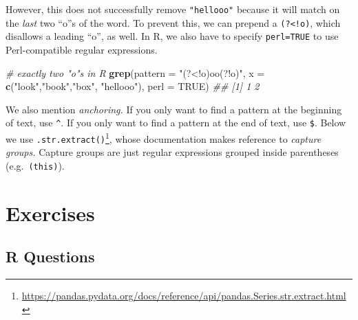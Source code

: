 \documentclass[12pt,krantz2]{krantz}
\makeatletter
\newenvironment{Shaded}{\begin{snugshade}}{\end{snugshade}}
\newcommand{\BuiltInTok}[1]{#1}
\newcommand{\CommentTok}[1]{\textcolor[rgb]{0.37,0.37,0.37}{\textit{#1}}}
\newcommand{\DataTypeTok}[1]{\textcolor[rgb]{0.27,0.27,0.27}{#1}}
\newcommand{\KeywordTok}[1]{\textcolor[rgb]{0.27,0.27,0.27}{\textbf{#1}}}
\newcommand{\NormalTok}[1]{#1}
\newcommand{\OperatorTok}[1]{\textcolor[rgb]{0.43,0.43,0.43}{\textbf{#1}}}
\newcommand{\OtherTok}[1]{\textcolor[rgb]{0.37,0.37,0.37}{#1}}
\newcommand{\StringTok}[1]{\textcolor[rgb]{0.5,0.5,0.5}{#1}}
\newcommand{\VerbatimStringTok}[1]{\textcolor[rgb]{0.5,0.5,0.5}{#1}}
\renewcommand{\href}[2]{#2\footnote{\url{#1}}}
\newenvironment{kframe}{%
\medskip{}
\setlength{\fboxsep}{.8em}
 \def\at@end@of@kframe{}%
 \ifinner\ifhmode%
  \def\at@end@of@kframe{\end{minipage}}%
  \begin{minipage}{\columnwidth}%
 \fi\fi%
 \def\FrameCommand##1{\hskip\@totalleftmargin \hskip-\fboxsep
 \colorbox{shadecolor}{##1}\hskip-\fboxsep
     \hskip-\linewidth \hskip-\@totalleftmargin \hskip\columnwidth}%
 \MakeFramed {\advance\hsize-\width
   \@totalleftmargin\z@ \linewidth\hsize
   \@setminipage}}%
 {\par\unskip\endMakeFramed%
 \at@end@of@kframe}
\renewenvironment{Shaded}{\begin{kframe}}{\end{kframe}}
\makeatother
\begin{document}
However, this does not successfully remove \texttt{"hellooo"} because it will match on the \emph{last} two ``o''s of the word. To prevent this, we can prepend a \texttt{(?\textless{}!o)}, which disallows a leading ``o'', as well. In R, we also have to specify \texttt{perl=TRUE} to use Perl-compatible regular expressions.

\begin{Shaded}
\begin{Highlighting}[]
\CommentTok{# exactly two "o"s in R}
\KeywordTok{grep}\NormalTok{(}\DataTypeTok{pattern =} \StringTok{"(?<!o)oo(?!o)"}\NormalTok{, }
     \DataTypeTok{x =} \KeywordTok{c}\NormalTok{(}\StringTok{"look"}\NormalTok{,}\StringTok{"book"}\NormalTok{,}\StringTok{"box"}\NormalTok{, }\StringTok{"hellooo"}\NormalTok{), }\DataTypeTok{perl =} \OtherTok{TRUE}\NormalTok{)}
\CommentTok{## [1] 1 2}
\end{Highlighting}
\end{Shaded}

We also mention \emph{anchoring.} If you only want to find a pattern at the beginning of text, use \texttt{\^{}}. If you only want to find a pattern at the end of text, use \texttt{\$}. Below we use \href{https://pandas.pydata.org/docs/reference/api/pandas.Series.str.extract.html}{\texttt{.str.extract()}}, whose documentation makes reference to \emph{capture groups.} Capture groups are just regular expressions grouped inside parentheses (e.g.~\texttt{(this)}).

\begin{Shaded}
\end{Shaded}

\hypertarget{exercises-1}{%
\section{Exercises}\label{exercises-1}}

\hypertarget{r-questions-1}{%
\subsection{R Questions}\label{r-questions-1}}
\end{document}
